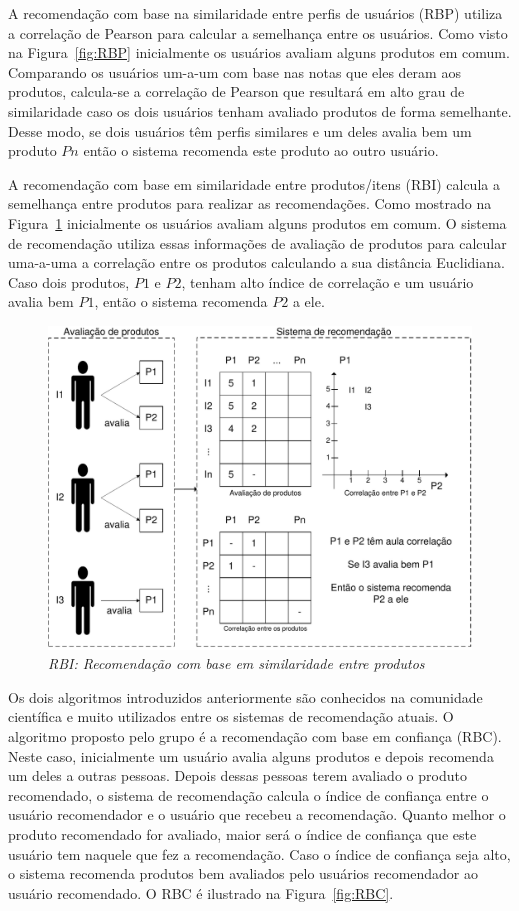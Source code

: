  A recomendação com base na similaridade entre perfis de usuários (RBP) utiliza a correlação de Pearson para calcular a semelhança entre os usuários. Como visto na Figura~\ref{fig:RBP} inicialmente os usuários avaliam alguns produtos em comum. Comparando os usuários um-a-um com base nas notas que eles deram aos produtos, calcula-se a correlação de Pearson que resultará em alto grau de similaridade caso os dois usuários tenham avaliado produtos de forma semelhante. Desse modo, se dois usuários têm perfis similares e um deles avalia bem um produto $P{n}$ então o sistema recomenda este produto ao outro usuário.
 
 A recomendação com base em similaridade entre produtos/itens (RBI) calcula a semelhança entre produtos para realizar as recomendações. Como mostrado na Figura~\ref{fig:RBI} inicialmente os usuários avaliam alguns produtos em comum. O sistema de recomendação utiliza essas informações de avaliação de produtos para calcular uma-a-uma a correlação entre os produtos calculando a sua distância Euclidiana. Caso dois produtos, $P{1}$ e $P{2}$, tenham alto índice de correlação e um usuário avalia bem $P{1}$, então o sistema recomenda $P{2}$ a ele.

\begin{figure}
  \centering
  \includegraphics[width=\textwidth]{imagens/RBI}
  \caption{\it RBI: Recomendação com base em similaridade entre produtos}
  \label{fig:RBI}
\end{figure}

 Os dois algoritmos introduzidos anteriormente são conhecidos na comunidade científica e muito utilizados entre os sistemas de recomendação atuais. O algoritmo proposto pelo grupo é a recomendação com base em confiança (RBC). Neste caso, inicialmente um usuário avalia alguns produtos e depois recomenda um deles a outras pessoas. Depois dessas pessoas terem avaliado o produto recomendado, o sistema de recomendação calcula o índice de confiança entre o usuário recomendador e o usuário que recebeu a recomendação. Quanto melhor o produto recomendado for avaliado, maior será o índice de confiança que este usuário tem naquele que fez a recomendação. Caso o índice de confiança seja alto, o sistema recomenda produtos bem avaliados pelo usuários recomendador ao usuário recomendado. O RBC é ilustrado na Figura~\ref{fig:RBC}.

